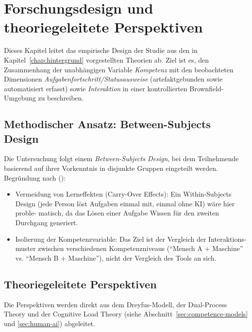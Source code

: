 \chapter{Forschungsdesign und theoriegeleitete Perspektiven}
\label{chap:forschungsdesign}

Dieses Kapitel leitet das empirische Design der Studie aus den in Kapitel~\ref{chap:hintergrund} vorgestellten Theorien ab. Ziel ist es, den Zusammenhang der unabhängigen Variable \emph{Kompetenz} mit den beobachteten Dimensionen \emph{Aufgabenfortschritt/Statusausweise} (artefaktgebunden sowie automatisiert erfasst) sowie \emph{Interaktion} in einer kontrollierten Brownfield-Umgebung zu beschreiben.

\section{Methodischer Ansatz: Between-Subjects Design}

Die Untersuchung folgt einem \emph{Between-Subjects Design}, bei dem Teilnehmende basierend\linebreak
auf ihrer Vorkenntnis in disjunkte Gruppen eingeteilt werden. Begründung nach\linebreak
    \citeauthor{wohlin2012experimentation} (\citeyear{wohlin2012experimentation}):
\begin{itemize}
    \item Vermeidung von Lerneffekten (Carry-Over Effects): Ein Within-Subjects\linebreak
    Design (jede Person löst Aufgaben einmal mit, einmal ohne KI) wäre hier proble-\linebreak
    matisch, da das Lösen einer Aufgabe Wissen für den zweiten Durchgang generiert.
    \item Isolierung der Kompetenzvariable: Das Ziel ist der Vergleich der Interaktions-\linebreak
    muster zwischen verschiedenen Kompetenzniveaus (\enquote{Mensch A + Maschine} vs.\linebreak
    \enquote{Mensch B + Maschine}), nicht der Vergleich des Tools an sich.
\end{itemize}

\section{Theoriegeleitete Perspektiven}

Die Perspektiven werden direkt aus dem Dreyfus-Modell, der Dual-Process Theory und der Cognitive Load Theory (siehe Abschnitt~\ref{sec:competence-models} und \ref{sec:human-ai}) abgeleitet.

